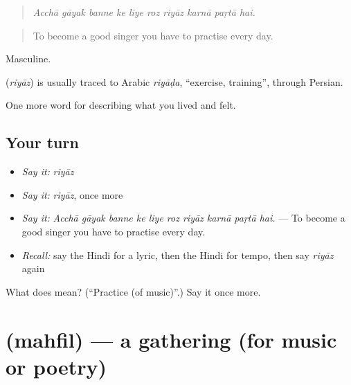 \begin{quote}
         
\end{quote}

\begin{quote}
\emph{Acchā gāyak banne ke liye roz riyāz karnā paṛtā hai.}
\end{quote}

\begin{quote}
To become a good singer you have to practise every day.
\end{quote}

Masculine.

\begin{cousinweb}
\textbf{} (\emph{riyāz}) is usually traced to Arabic \emph{riyāḍa}, \textquotedblleft{}exercise, training\textquotedblright{}, through Persian.
\end{cousinweb}

\begin{grammarlens}[title={What you've built}]
One more word for describing what you lived and felt.
\end{grammarlens}

\subsection*{Your turn}
\begin{itemize}
\raggedright
  \item \emph{Say it:} \emph{riyāz}
  \item \emph{Say it:} \emph{riyāz}, once more
  \item \emph{Say it:} \emph{Acchā gāyak banne ke liye roz riyāz karnā paṛtā hai.} — To become a good singer you have to practise every day.
  \item \emph{Recall:} say the Hindi for a lyric, then the Hindi for tempo, then say \emph{riyāz} again
\end{itemize}

\begin{tcolorbox}[breakable,colback=teal!4,colframe=teal!35!black,title={Before you move on}]
What does  mean? (\textquotedblleft{}Practice (of music)\textquotedblright{}.) Say it once more.
\end{tcolorbox}
\section[\texorpdfstring{\hi{महफ़िल} (mahfil)}{महफ़िल (mahfil)}]{ (mahfil) — a gathering (for music or poetry)}

